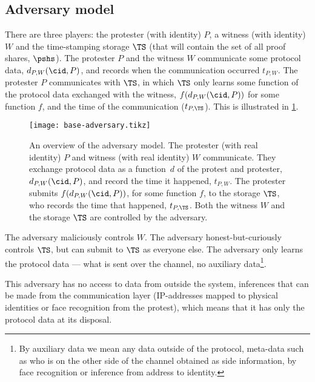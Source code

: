 \subsection{Adversary model}%
\label{formal-adversary-model}


There are three players: the protester (with identity) \(P\), a witness (with 
identity) \(W\) and the time-stamping storage \(\TS\) (that will contain the 
set of all proof shares, \(\pshs\)).
The protester \(P\) and the witness \(W\) communicate some protocol data,
\(d_{P,W}(\cid, P)\), and records when the communication occurred \(t_{P,W}\).
The protester \(P\) communicates with \(\TS\), in which \(\TS\) only learns 
some function of the protocol data exchanged with the witness, 
\(f(d_{P,W}(\cid, P))\) for some function \(f\), and the time of the 
communication (\(t_{P,\TS}\)).
This is illustrated in \cref{fig:base-adversary}.

\begin{figure}
  \centering
  \texttt{[image: base-adversary.tikz]}
  \caption{\label{fig:base-adversary}%
    An overview of the adversary model.
    The protester (with real identity) \(P\) and witness (with real identity) 
    \(W\) communicate.
    They exchange protocol data as a function~\(d\) of the protest and 
    protester, \(d_{P,W}(\cid, P)\), and record the time it happened, 
    \(t_{P,W}\).
    The protester submits \(f(d_{P,W}(\cid, P))\), for some function \(f\), to 
    the storage \(\TS\), who records the time that happened, \(t_{P,\TS}\).
    Both the witness \(W\) and the storage \(\TS\) are controlled by the 
    adversary.
  }
\end{figure}

The adversary maliciously controls \(W\).
The adversary honest-but-curiously controls \(\TS\), but can submit to \(\TS\) 
as everyone else.
The adversary only learns the protocol data --- \ie what is sent over the 
channel, no auxiliary data\footnote{%
  By auxiliary data we mean any data outside of the protocol, \ie
  meta-data such as who is on the other side of the channel obtained
  as side information, \eg by face recognition or inference from address
  to identity.
}.

This adversary has no access to data from outside the system, \eg inferences 
that can be made from the communication layer (\eg IP-addresses mapped to 
physical identities or face recognition from the protest), which means that it 
has only the protocol data at its disposal.

